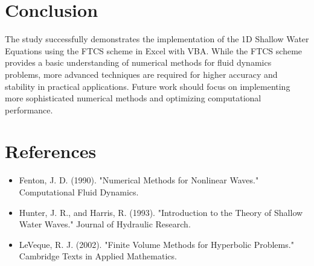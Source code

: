 \documentclass[12pt]{article}
\begin{document}
\section{Conclusion}

The study successfully demonstrates the implementation of the 1D Shallow Water Equations using the FTCS scheme in Excel with VBA. While the FTCS scheme provides a basic understanding of numerical methods for fluid dynamics problems, more advanced techniques are required for higher accuracy and stability in practical applications. Future work should focus on implementing more sophisticated numerical methods and optimizing computational performance.

\section{References}

\begin{itemize}
    \item Fenton, J. D. (1990). "Numerical Methods for Nonlinear Waves." Computational Fluid Dynamics.
    \item Hunter, J. R., and Harris, R. (1993). "Introduction to the Theory of Shallow Water Waves." Journal of Hydraulic Research.
    \item LeVeque, R. J. (2002). "Finite Volume Methods for Hyperbolic Problems." Cambridge Texts in Applied Mathematics.
\end{itemize}
\end{document}
